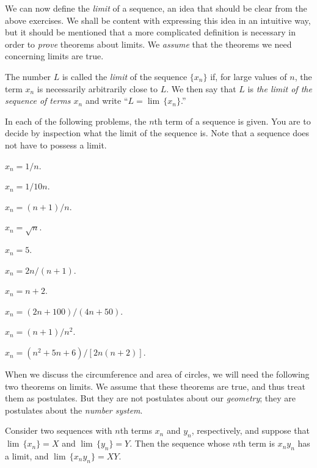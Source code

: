 \documentclass[11pt]{book}
\theoremstyle{XIplainnote}
\theoremstyle{bkplain}
\begin{document}
We can now define the \emph{limit} of a sequence, an idea that should be clear
from the above exercises. We shall be content with expressing this idea in an
intuitive way, but it should be mentioned that a more complicated definition is
necessary in order to \emph{prove} theorems about limits. We \emph{assume} that
the theorems we need concerning limits are true.

\begin{definition}
The number $L$ is called the \emph{limit} of the sequence $\{x_n\}$ if, for
large values of $n$, the term $x_n$ is necessarily arbitrarily close to $L$. We
then say that $L$ is \emph{the limit of the sequence of terms $x_n$} and write
``$L = \lim\,\{x_n\}$.''
\end{definition}

In each of the following problems, the $n$th term of a sequence is given. You
are to decide by inspection what the limit of the sequence is. Note that a
sequence does not have to possess a limit.
\begin{exercisecols}
\begin{exlist}
\item $x_n = 1/n$.
\item $x_n = 1/10n$.
\item $x_n = (n+1)/n$.
\item $x_n = \sqrt{n}$.
\item $x_n = 5$.
\item $x_n = 2n/(n+1)$.
\item $x_n = n + 2$.
\item[\stex 8.] $x_n = (2n + 100)/(4n + 50)$.
\item[\stex 9.] $x_n = (n + 1)/n^2$.
\item[\stex 10.] $x_n = (n^2 + 5n + 6)/[2n(n + 2)]$.
\end{exlist}
\end{exercisecols}

When we discuss the circumference and area of circles, we will need the
following two theorems on limits. We assume that these theorems are true, and
thus treat them as postulates. But they are not postulates about our
\emph{geometry}; they are postulates about the \emph{number system}.

\begin{theorem}
Consider two sequences with $n$th terms $x_n$ and $y_n$, respectively, and
suppose that $\lim\,\{x_n\} = X$ and $\lim\,\{y_n\} = Y$. Then the sequence
whose $n$th term is $x_n y_n$ has a limit, and $\lim\,\{x_n y_n\} = XY$.
\end{theorem}
\end{document}
